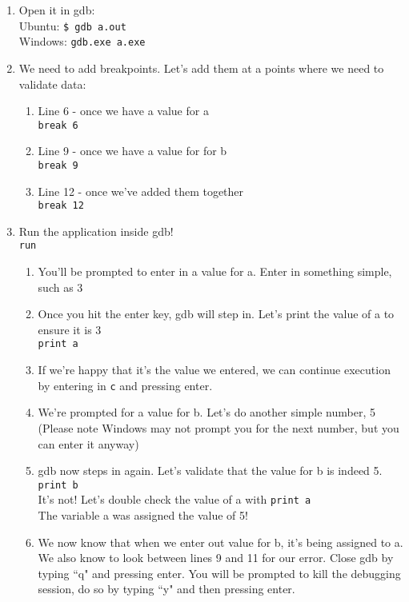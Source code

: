 \begin{enumerate}
    \item Open it in gdb:\\
        Ubuntu: \verb|$ gdb a.out|\\
        Windows: \verb|gdb.exe a.exe| 
    \item We need to add breakpoints. Let's add them at a points where we need to validate data:
    \begin{enumerate}
        \item Line 6 - once we have a value for a\\
        \verb|break 6|
        \item Line 9 - once we have a value for for b\\
        \verb|break 9|
        \item Line 12 - once we've added them together\\
        \verb|break 12|
    \end{enumerate}
    \item Run the application inside gdb!\\
    \verb|run|
    \begin{enumerate}
        \item You'll be prompted to enter in a value for a. Enter in something simple, such as 3
        \item Once you hit the enter key, gdb will step in. Let's print the value of a to ensure it is 3\\
        \verb|print a|
        \item If we're happy that it's the value we entered, we can continue execution by entering in \verb|c| and pressing enter.
        \item We're prompted for a value for b. Let's do another simple number, 5 \\(Please note Windows may not prompt you for the next number, but you can enter it anyway) %
        \item gdb now steps in again. Let's validate that the value for b is indeed 5.\\
        \verb|print b|\\
        It's not! Let's double check the value of a with \verb|print a|\\
        The variable a was assigned the value of 5!
        \item We now know that when we enter out value for b, it's being assigned to a. We also know to look between lines 9 and 11 for our error. Close gdb by typing ``q" and pressing enter. You will be prompted to kill the debugging session, do so by typing ``y" and then pressing enter.

\end{enumerate}
\end{enumerate}

